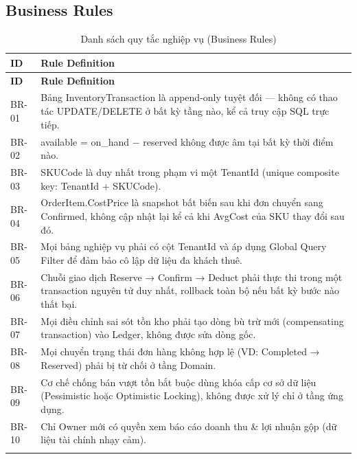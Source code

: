 \subsection{Business Rules}

\begin{longtable}{|p{1.6cm}|p{12cm}|}
    \hline
    \textbf{ID} & \textbf{Rule Definition} \\
    \hline
    \endfirsthead
    \hline
    \textbf{ID} & \textbf{Rule Definition} \\
    \hline
    \endhead
    BR-01 & Bảng InventoryTransaction là append-only tuyệt đối — không có thao tác UPDATE/DELETE ở bất kỳ tầng nào, kể cả truy cập SQL trực tiếp. \\
    \hline
    BR-02 & available = on\_hand − reserved không được âm tại bất kỳ thời điểm nào. \\
    \hline
    BR-03 & SKUCode là duy nhất trong phạm vi một TenantId (unique composite key: TenantId + SKUCode). \\
    \hline
    BR-04 & OrderItem.CostPrice là snapshot bất biến sau khi đơn chuyển sang Confirmed, không cập nhật lại kể cả khi AvgCost của SKU thay đổi sau đó. \\
    \hline
    BR-05 & Mọi bảng nghiệp vụ phải có cột TenantId và áp dụng Global Query Filter để đảm bảo cô lập dữ liệu đa khách thuê. \\
    \hline
    BR-06 & Chuỗi giao dịch Reserve → Confirm → Deduct phải thực thi trong một transaction nguyên tử duy nhất, rollback toàn bộ nếu bất kỳ bước nào thất bại. \\
    \hline
    BR-07 & Mọi điều chỉnh sai sót tồn kho phải tạo dòng bù trừ mới (compensating transaction) vào Ledger, không được sửa dòng gốc. \\
    \hline
    BR-08 & Mọi chuyển trạng thái đơn hàng không hợp lệ (VD: Completed → Reserved) phải bị từ chối ở tầng Domain. \\
    \hline
    BR-09 & Cơ chế chống bán vượt tồn bắt buộc dùng khóa cấp cơ sở dữ liệu (Pessimistic hoặc Optimistic Locking), không được xử lý chỉ ở tầng ứng dụng. \\
    \hline
    BR-10 & Chỉ Owner mới có quyền xem báo cáo doanh thu \& lợi nhuận gộp (dữ liệu tài chính nhạy cảm). \\
    \hline
    \caption{Danh sách quy tắc nghiệp vụ (Business Rules)}
    \label{tab:business-rules}
\end{longtable}

